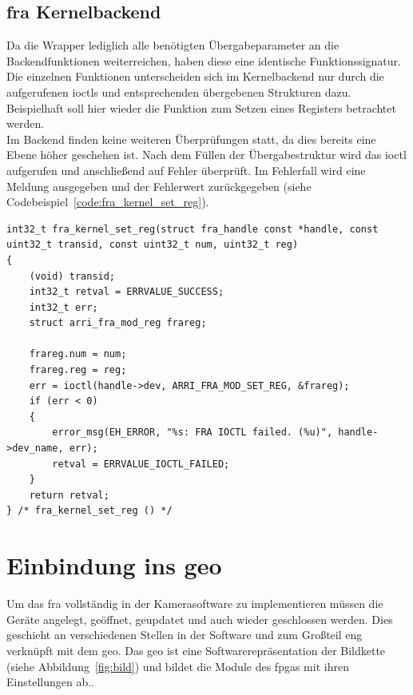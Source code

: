 \subsection{\acs{fra} Kernelbackend}
Da die Wrapper lediglich alle benötigten Übergabeparameter an die Backendfunktionen weiterreichen, haben diese eine identische Funktionssignatur. 
Die einzelnen Funktionen unterscheiden sich im Kernelbackend nur durch die aufgerufenen \ac{ioctl}s und entsprechenden übergebenen Strukturen dazu. Beispielhaft soll hier wieder die Funktion zum Setzen eines Registers betrachtet werden. \\


Im Backend finden keine weiteren Überprüfungen statt, da dies bereits eine Ebene höher geschehen ist. Nach dem Füllen der Übergabestruktur wird das \ac{ioctl} aufgerufen und anschließend auf Fehler überprüft. 
Im Fehlerfall wird eine Meldung ausgegeben und der Fehlerwert zurückgegeben (siehe Codebeispiel~\ref{code:fra_kernel_set_reg}). 


\begin{lstfloat}
\begin{lstlisting}
int32_t fra_kernel_set_reg(struct fra_handle const *handle, const uint32_t transid, const uint32_t num, uint32_t reg)
{
	(void) transid;
	int32_t retval = ERRVALUE_SUCCESS;
	int32_t err;
	struct arri_fra_mod_reg frareg;
	
	frareg.num = num;
	frareg.reg = reg;
	err = ioctl(handle->dev, ARRI_FRA_MOD_SET_REG, &frareg);
	if (err < 0)
	{
		error_msg(EH_ERROR, "%s: FRA IOCTL failed. (%u)", handle->dev_name, err);
		retval = ERRVALUE_IOCTL_FAILED;
	}  
	return retval;
} /* fra_kernel_set_reg () */
\end{lstlisting}
\end{lstfloat}

\section{Einbindung ins \acl{geo}}\label{sec:soft}
Um das \ac{fra} vollständig in der Kamerasoftware zu implementieren müssen die Geräte angelegt, geöffnet, geupdatet und auch wieder geschlossen werden. Dies geschieht an verschiedenen Stellen in der Software und zum Großteil eng verknüpft mit dem \ac{geo}. Das \ac{geo} ist eine Softwarerepräsentation der Bildkette (siehe Abbildung~\ref{fig:bild}) und bildet die Module des \ac{fpga}s mit ihren Einstellungen ab..\\


